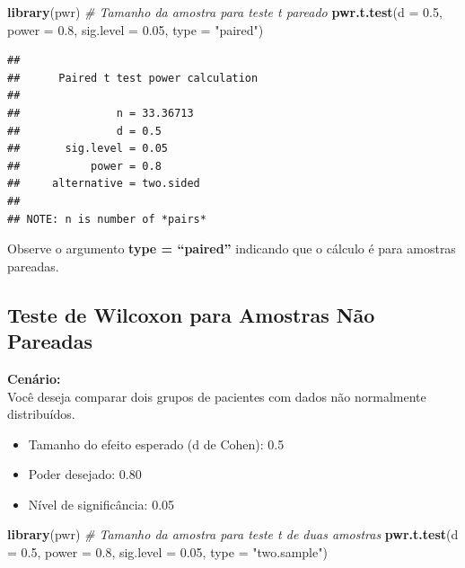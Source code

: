 \documentclass[
]{book}
\newenvironment{Shaded}{\begin{snugshade}}{\end{snugshade}}
\newcommand{\AttributeTok}[1]{\textcolor[rgb]{0.13,0.29,0.53}{#1}}
\newcommand{\CommentTok}[1]{\textcolor[rgb]{0.56,0.35,0.01}{\textit{#1}}}
\newcommand{\FloatTok}[1]{\textcolor[rgb]{0.00,0.00,0.81}{#1}}
\newcommand{\FunctionTok}[1]{\textcolor[rgb]{0.13,0.29,0.53}{\textbf{#1}}}
\newcommand{\NormalTok}[1]{#1}
\newcommand{\StringTok}[1]{\textcolor[rgb]{0.31,0.60,0.02}{#1}}
\providecommand{\tightlist}{%
  \setlength{\itemsep}{0pt}\setlength{\parskip}{0pt}}
\begin{document}
\begin{Shaded}
\begin{Highlighting}[]
\FunctionTok{library}\NormalTok{(pwr)}
\CommentTok{\# Tamanho da amostra para teste t pareado}
\FunctionTok{pwr.t.test}\NormalTok{(}\AttributeTok{d =} \FloatTok{0.5}\NormalTok{, }\AttributeTok{power =} \FloatTok{0.8}\NormalTok{, }\AttributeTok{sig.level =} \FloatTok{0.05}\NormalTok{, }\AttributeTok{type =} \StringTok{"paired"}\NormalTok{)}
\end{Highlighting}
\end{Shaded}

\begin{verbatim}
## 
##      Paired t test power calculation 
## 
##               n = 33.36713
##               d = 0.5
##       sig.level = 0.05
##           power = 0.8
##     alternative = two.sided
## 
## NOTE: n is number of *pairs*
\end{verbatim}

Observe o argumento \textbf{type = ``paired''} indicando que o cálculo é para amostras pareadas.

\subsection{Teste de Wilcoxon para Amostras Não Pareadas}\label{teste-de-wilcoxon-para-amostras-nuxe3o-pareadas}

\textbf{Cenário:}\\
Você deseja comparar dois grupos de pacientes com dados não normalmente distribuídos.

\begin{itemize}
\tightlist
\item
  Tamanho do efeito esperado (d de Cohen): 0.5\\
\item
  Poder desejado: 0.80\\
\item
  Nível de significância: 0.05
\end{itemize}

\begin{Shaded}
\begin{Highlighting}[]
\FunctionTok{library}\NormalTok{(pwr)}
\CommentTok{\# Tamanho da amostra para teste t de duas amostras}
\FunctionTok{pwr.t.test}\NormalTok{(}\AttributeTok{d =} \FloatTok{0.5}\NormalTok{, }\AttributeTok{power =} \FloatTok{0.8}\NormalTok{, }\AttributeTok{sig.level =} \FloatTok{0.05}\NormalTok{, }\AttributeTok{type =} \StringTok{"two.sample"}\NormalTok{)}
\end{Highlighting}
\end{Shaded}
\end{document}
